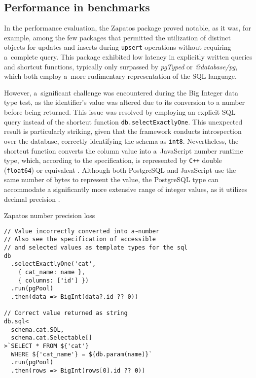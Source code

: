 \subsection*{Performance in benchmarks}

In the performance evaluation, the Zapatos package proved notable, as it was,
for example, among the few packages that permitted the utilization of distinct
objects for updates and inserts during \texttt{upsert} operations without
requiring a~complete query. This package exhibited low latency in explicitly
written queries and shortcut functions, typically only surpassed by
\textit{pgTyped} or \textit{@database/pg}, which both employ a~more rudimentary
representation of the SQL language.

However, a~significant challenge was encountered during the Big Integer data
type test, as the identifier's value was altered due to its conversion to a
number before being returned. This issue was resolved by employing an explicit
SQL query instead of the shortcut function \texttt{db.selectExactlyOne}. This
unexpected result is particularly striking, given that the framework conducts
introspection over the database, correctly identifying the schema as
\texttt{int8}. Nevertheless, the shortcut function converts the column value
into a~JavaScript number runtime type, which, according to the specification, is
represented by \texttt{C++} double (\texttt{float64}) or equivalent
\cite{MDNNumber}. Although both PostgreSQL and JavaScript use the same number of
bytes to represent the value, the PostgreSQL type can accommodate a
significantly more extensive range of integer values, as it utilizes decimal
precision \cite{PostgresNumeric}.

\begin{listing}
\caption{Zapatos number precision loss}

\begin{verbatim}
// Value incorrectly converted into a~number
// Also see the specification of accessible 
// and selected values as template types for the sql
db
  .selectExactlyOne('cat', 
    { cat_name: name }, 
    { columns: ['id'] })
  .run(pgPool)
  .then(data => BigInt(data?.id ?? 0))

// Correct value returned as string
db.sql<
  schema.cat.SQL,
  schema.cat.Selectable[]
>`SELECT * FROM ${'cat'} 
  WHERE ${'cat_name'} = ${db.param(name)}`
  .run(pgPool)
  .then(rows => BigInt(rows[0].id ?? 0))
\end{verbatim}
\end{listing}

